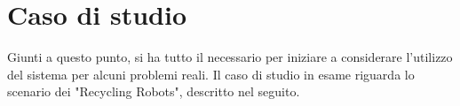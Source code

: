 \chapter{Caso di studio} \label{caso_studio}

Giunti a questo punto, si ha tutto il necessario per iniziare a considerare l’utilizzo del sistema per alcuni problemi reali. Il caso di studio in esame riguarda lo scenario dei "Recycling Robots", descritto nel seguito.

